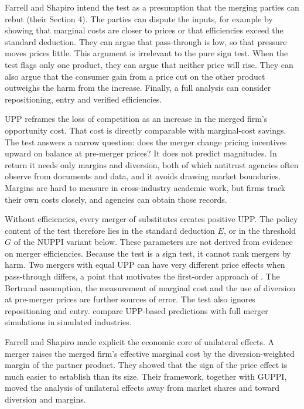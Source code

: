  Farrell and Shapiro intend the test as a presumption that the merging parties can rebut
(their Section 4). The parties can dispute the inputs, for example by showing that marginal costs are closer to prices
or that efficiencies exceed the standard deduction. They can argue that pass-through is low, so that pressure moves
prices little. This argument is irrelevant to the pure sign test. When the test flags only one product, they can argue
that neither price will rise. They can also argue that the consumer gain from a price cut on the other product
outweighs the harm from the increase.
Finally, a full analysis can consider repositioning, entry and verified efficiencies.

 UPP reframes the loss of competition as an increase in the merged firm's opportunity cost.
That cost is directly comparable with marginal-cost savings. The test answers a narrow question: does the merger
change pricing incentives upward on balance at pre-merger prices? It does not predict magnitudes. In return it needs
only margins and diversion, both of which antitrust agencies often observe from documents and data, and it avoids
drawing market boundaries. Margins are hard to measure in cross-industry academic work, but firms track their own
costs closely, and agencies can obtain those records.

 Without efficiencies, every merger of substitutes creates positive UPP. The policy content of the
test therefore lies in the standard deduction $E$, or in the threshold $G$ of the NUPPI variant below. These
parameters are not derived from evidence on merger efficiencies. Because the test is a sign test, it cannot rank
mergers by harm. Two mergers with equal UPP can have very different price effects when pass-through differs, a point
that motivates the first-order approach of \citet{JaffeWeyl2013}. The Bertrand assumption, the measurement of
marginal cost and the use of diversion at pre-merger prices are further sources of error. The test also ignores
repositioning and entry. \citet{MillerEtAl2017} compare UPP-based predictions with full merger simulations in
simulated industries.

 Farrell and Shapiro made explicit the economic core of unilateral effects. A merger raises
the merged firm's effective marginal cost by the diversion-weighted margin of the partner product. They showed that the sign of the price effect is much easier to establish than its size. Their
framework, together with GUPPI, moved the analysis of unilateral effects away from market shares and toward diversion
and margins.

